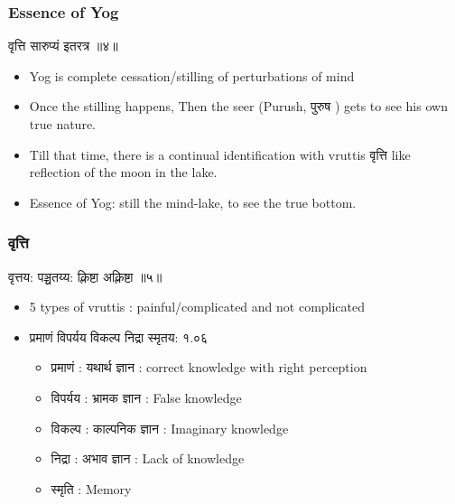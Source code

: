 \begin{frame}[fragile]\frametitle{Essence of Yog}

\begin{sanskrit}
वृत्ति सारुप्यं इतरत्र ॥४॥
\end{sanskrit}


	\begin{itemize}
	\item Yog is complete cessation/stilling of perturbations of mind
	\item Once the stilling happens, Then the seer (Purush, पुरुष ) gets to see his own true nature.
	\item Till that time, there is a continual identification with vruttis वृत्ति like reflection of the moon in the lake.
	\item Essence of Yog: still the mind-lake, to see the true bottom.
	\end{itemize}

\end{frame}


\begin{frame}[fragile]\frametitle{वृत्ति}

\begin{sanskrit}
वृत्तय: पञ्चतय्य: क्लिष्टा अक्लिष्टा ॥५॥
\end{sanskrit}


	\begin{itemize}
	\item 5 types of vruttis : painful/complicated and not complicated
	\item प्रमाणं विपर्यय विकल्प निद्रा स्मृतय: १.०६
		\begin{itemize}
		\item प्रमाणं : यथार्थ ज्ञान : correct knowledge with right perception
		\item विपर्यय : भ्रामक ज्ञान : False knowledge
		\item विकल्प : काल्पनिक ज्ञान : Imaginary knowledge
		\item निद्रा : अभाव ज्ञान : Lack of knowledge
		\item स्मृति : Memory
		
		\end{itemize}	
	\end{itemize}

\end{frame}


